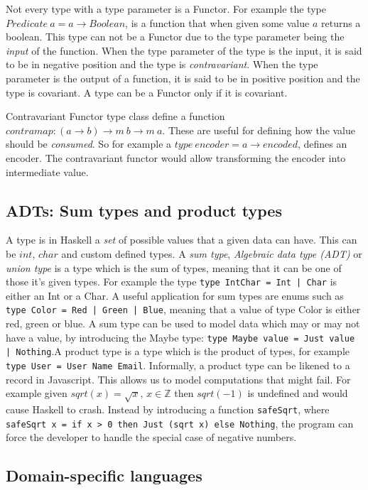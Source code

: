 Not every type with a type parameter is a Functor. For example the type
$Predicate\ a = a \rightarrow Boolean$, is a function that when given some value
$a$ returns a boolean. This type can not be a Functor due to the type parameter
being the \textit{input} of the function. When the type parameter of the type is
the input, it is said to be in negative position and the type is
\textit{contravariant}.  When the type parameter is the output of a function, it
is said to be in positive position and the type is covariant. A type can be a
Functor only if it is covariant.

Contravariant Functor type class define a function $contramap : (a\rightarrow b)
\rightarrow m\ b \rightarrow m\ a$. These are useful for defining how the value
should be \textit{consumed}. So for example a $type\ encoder = a\rightarrow
encoded$, defines an encoder. The contravariant functor would allow transforming
the encoder into intermediate value.


\subsection{ADTs: Sum types and product types}\label{types}

A type is in Haskell a \textit{set} of possible values that a given data can
have. This can be $int$, $char$ and custom defined types. A \textit{sum type},
\textit{Algebraic data type (ADT)} or \textit{union type} is a type which is the
sum of types, meaning that it can be one of those it's given types. For example
the type \texttt{type IntChar = Int | Char} is either an Int or a Char. A useful
application for sum types are enums such as \texttt{type Color = Red | Green |
Blue}, meaning that a value of type Color is either red, green or blue. A sum
type can be used to model data which may or may not have a value, by introducing
the Maybe type: \texttt{type Maybe value = Just value | Nothing}.A product type
is a type which is the product of types, for example \texttt{type User = User
Name Email}.  Informally, a product type can be likened to a record in
Javascript.  This allows us to model computations that might fail. For example
given $sqrt(x) = \sqrt{x},\, x\in \mathbb{Z}$ then $sqrt(-1)$ is undefined and
would cause Haskell to crash.  Instead by introducing a function
\texttt{safeSqrt}, where \texttt{safeSqrt x = if x > 0 then Just (sqrt x) else
Nothing}, the program can force the developer to handle the special case of
negative numbers. 

\subsection{Domain-specific languages}

